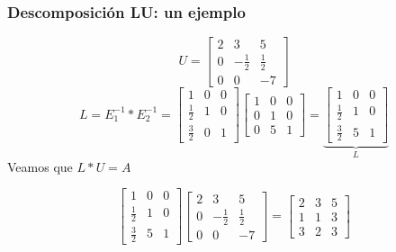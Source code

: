 \documentclass[xcolor=svgnames]{beamer} %
\theoremstyle{plain}
\theoremstyle{definition}
\begin{document}
\begin{frame}
\frametitle{Descomposición LU: un ejemplo}
$$ U = \begin{bmatrix}
2 & 3 & 5 \\
0 & -\frac{1}{2} & \frac{1}{2} \\
0 &  0 & -7
\end{bmatrix}$$
\pause
$$L = E_1^{-1} * E_2^{-1} = \begin{bmatrix}
1 			& 0 & 0 \\
\frac{1}{2} 	& 1 & 0 \\
\frac{3}{2} 	& 0 & 1 
\end{bmatrix} \begin{bmatrix}
1 			& 0 & 0 \\
0		 	& 1 & 0 \\
0		 	& 5 & 1 
\end{bmatrix} = \underbrace{\begin{bmatrix}
1 			& 0 & 0 \\
\frac{1}{2} 	& 1 & 0 \\
\frac{3}{2} 	& 5 & 1 
\end{bmatrix}}_{L}$$
\pause
Veamos que $L*U = A$

$$\begin{bmatrix}
1 			& 0 & 0 \\
\frac{1}{2} 	& 1 & 0 \\
\frac{3}{2} 	& 5 & 1 
\end{bmatrix} \begin{bmatrix}
2 & 3 & 5 \\
0 & -\frac{1}{2} & \frac{1}{2} \\
0 &  0 & -7
\end{bmatrix} = \begin{bmatrix}
2 & 3 & 5\\
1 & 1 & 3\\
3 & 2 & 3
\end{bmatrix}  $$

\end{frame}
\end{document}
